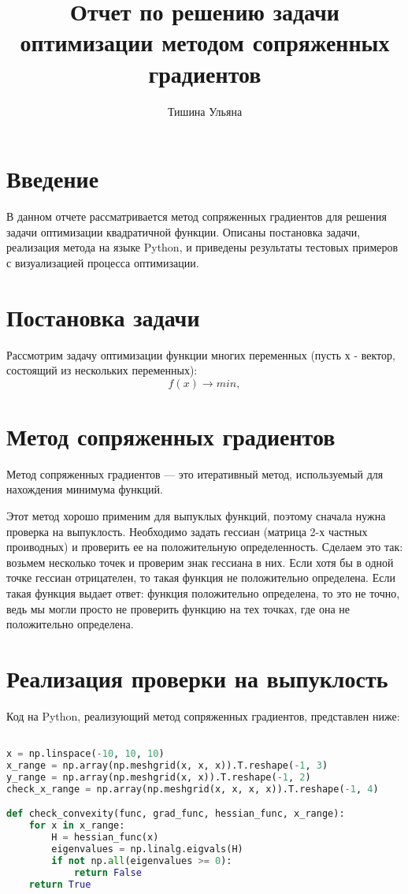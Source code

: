 \documentclass{article}
\title{Отчет по решению задачи оптимизации методом сопряженных градиентов}
\author{Тишина Ульяна}
\begin{document}
\maketitle

\newpage
\tableofcontents

\newpage
\section{Введение}
В данном отчете рассматривается метод сопряженных градиентов для решения задачи оптимизации квадратичной функции. Описаны постановка задачи, реализация метода на языке Python, и приведены результаты тестовых примеров с визуализацией процесса оптимизации.

\newpage
\section{Постановка задачи}
Рассмотрим задачу оптимизации функции многих переменных (пусть х - вектор, состоящий из нескольких переменных):
\begin{equation}
f(x)  \rightarrow min,
\end{equation}

\section{Метод сопряженных градиентов}
Метод сопряженных градиентов — это итеративный метод, используемый для нахождения минимума функций.

Этот метод хорошо применим для выпуклых функций, поэтому сначала нужна проверка на выпуклость. Необходимо задать гессиан (матрица 2-х частных проиводных) и проверить ее на положительную определенность. Сделаем это так: возьмем несколько точек и проверим знак гессиана в них. Если хотя бы в одной точке гессиан отрицателен, то такая функция не положительно определена. Если такая функция выдает ответ: функция положительно определена, то это не точно, ведь мы могли просто не проверить функцию на тех точках, где она не положительно определена.

\section{Реализация проверки на выпуклость}
Код на Python, реализующий метод сопряженных градиентов, представлен ниже:

\begin{lstlisting}[language=Python]

x = np.linspace(-10, 10, 10)
x_range = np.array(np.meshgrid(x, x, x)).T.reshape(-1, 3)
y_range = np.array(np.meshgrid(x, x)).T.reshape(-1, 2)
check_x_range = np.array(np.meshgrid(x, x, x, x)).T.reshape(-1, 4)

def check_convexity(func, grad_func, hessian_func, x_range):
    for x in x_range:
        H = hessian_func(x)
        eigenvalues = np.linalg.eigvals(H)
        if not np.all(eigenvalues >= 0):
            return False
    return True

\end{lstlisting}
\end{document}
